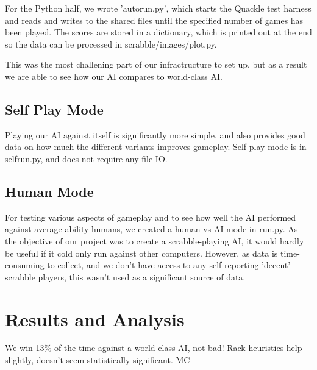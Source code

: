 \documentclass[12pt]{article}
\begin{document}
For the Python half, we wrote 'autorun.py', which starts the Quackle
test harness and reads and writes to the shared files until the
specified number of games has been played. The scores are stored in a
dictionary, which is printed out at the end so the data can be
processed in scrabble/images/plot.py.

This was the most challening part of our infractructure to set up, but
as a result we are able to see how our AI compares to  world-class
AI.

\subsection*{Self Play Mode}
Playing our AI against itself is significantly more simple, and also
provides good data on how much the different variants improves
gameplay. Self-play mode is in selfrun.py, and does not require any
file IO.

\subsection*{Human Mode}

For testing various aspects of gameplay and to see how well the AI
performed against average-ability humans, we created a human vs AI
mode in run.py. As the objective of our project was to create a scrabble-playing AI, it would hardly be useful if it cold only run against other computers. However, as data is time-consuming to collect, and we don't have access to any self-reporting 'decent' scrabble players, this wasn't used as a significant source of data. 

\section*{Results and Analysis}
We win 13\% of the time against a world class AI, not bad! Rack
heuristics help slightly, doesn't seem statistically significant. MC
\end{document}
